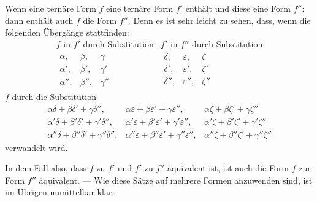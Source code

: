 Wenn eine ternäre Form $f$ eine ternäre Form $f'$ enthält und diese eine Form $f''$: dann enthält auch $f$ die Form $f''$. Denn es ist sehr leicht zu sehen, dass, wenn die folgenden Übergänge stattfinden:
\[
\begin{array}{c|c}
f\text{ in }f'\text{ durch Substitution} & f'\text{ in }f''\text{ durch Substitution} \\[2pt]
\begin{array}{ccc}
\alpha, & \beta, & \gamma \\
\alpha', & \beta', & \gamma' \\
\alpha'', & \beta'', & \gamma''
\end{array}
&
\begin{array}{ccc}
\delta, & \varepsilon, & \zeta \\
\delta', & \varepsilon', & \zeta' \\
\delta'', & \varepsilon'', & \zeta''
\end{array}
\end{array}
\]
$f$ durch die Substitution
\[
\begin{array}{ccc}
\alpha\delta+\beta\delta'+\gamma\delta'', & \alpha\varepsilon+\beta\varepsilon'+\gamma\varepsilon'', & \alpha\zeta+\beta\zeta'+\gamma\zeta'' \\
\alpha'\delta+\beta'\delta'+\gamma'\delta'', & \alpha'\varepsilon+\beta'\varepsilon'+\gamma'\varepsilon'', & \alpha'\zeta+\beta'\zeta'+\gamma'\zeta'' \\
\alpha''\delta+\beta''\delta'+\gamma''\delta'', & \alpha''\varepsilon+\beta''\varepsilon'+\gamma''\varepsilon'', & \alpha''\zeta+\beta''\zeta'+\gamma''\zeta''
\end{array}
\]
verwandelt wird.

In dem Fall also, dass $f$ zu $f'$ und $f'$ zu $f''$ äquivalent ist, ist auch die Form $f$ zur Form $f''$ äquivalent. --- Wie diese Sätze auf mehrere Formen anzuwenden sind, ist im Übrigen unmittelbar klar.
